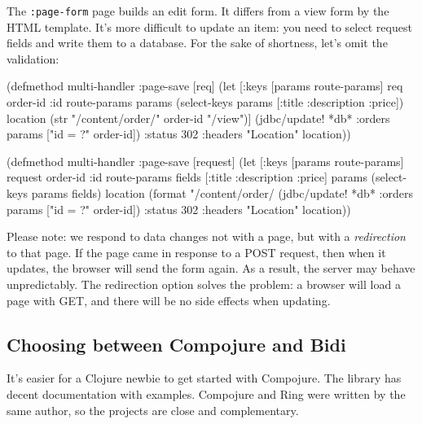 The \verb|:page-form| page builds an edit form. It differs from a view form by the HTML template. It's more difficult to update an item: you need to select request fields and write them to a database. For the sake of shortness, let's omit the validation:

\ifx\DEVICETYPE\MOBILE

\begin{english}
  \begin{clojure}
(defmethod multi-handler :page-save
  [req]
  (let [{:keys [params route-params]} req
        {order-id :id} route-params
        params (select-keys params
                 [:title :description
                  :price])
        location (str "/content/order/"
                   order-id "/view")]
    (jdbc/update! *db* :orders
      params ["id = ?" order-id])
    {:status 302
     :headers {"Location" location}}))
  \end{clojure}
\end{english}

\else

\begin{english}
  \begin{clojure}
(defmethod multi-handler :page-save
  [request]
  (let [{:keys [params route-params]} request
        {order-id :id} route-params
        fields [:title :description :price]
        params (select-keys params fields)
        location (format "/content/order/%
    (jdbc/update! *db* :orders params ["id = ?" order-id])
    {:status 302
     :headers {"Location" location}}))
  \end{clojure}
\end{english}

\fi


Please note: we respond to data changes not with a page, but with a  \emph{redirection} to that page. If the page came in response to a POST request, then when it updates, the browser will send the form again. As a result, the server may behave unpredictably. The redirection option solves the problem: a browser will load a page with GET, and there will be no side effects when updating.

\subsection{Choosing between Compojure and Bidi}

It's easier for a Clojure newbie to get started with Compojure. The library has decent documentation with examples. Compojure and Ring were written by the same author, so the projects are close and complementary.

